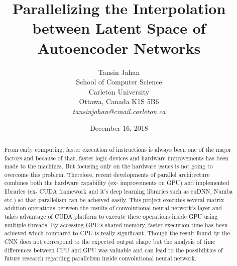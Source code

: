 \documentclass[11pt]{article}       %
\begin{document}


\title{Parallelizing the Interpolation between Latent Space of Autoencoder
Networks}


\author{
Tansin Jahan\\
School of Computer Science\\
Carleton University\\
Ottawa, Canada K1S 5B6\\
{\em tansinjahan@cmail.carleton.ca}
} %
\date{December 16, 2018}
\maketitle

\begin{abstract}
From early computing, faster execution of instructions is always been one of the major factors and because of that, faster logic devices and hardware improvements has been made to the machines. But focusing only on the hardware issues is not going to overcome this problem. Therefore, recent developments of parallel architecture combines both the hardware capability (ex- improvements on GPU) and implemented libraries (ex- CUDA framework and it's deep learning libraries such as cuDNN, Numba etc.) so that parallelism can be acheived easily. This project executes several matrix addition operations between the results of convolutional neural network's layer and takes advantage of CUDA platform to execute these operations inside GPU using multiple threads. By accessing GPU's shared memory, faster execution time has been achieved which compared to CPU is really significant. Though the result found by the CNN does not correspond to the expected output shape but the analysis of time differences between CPU and GPU was valuable and can lead to the possibilities of future research regarding parallelism inside convolutional neural network.       
\end{abstract}
\end{document}
